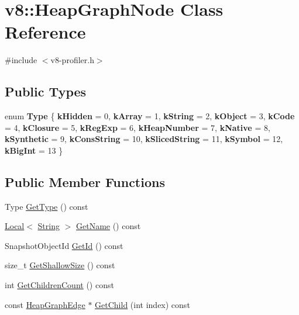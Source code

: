 \hypertarget{classv8_1_1HeapGraphNode}{}\section{v8\+:\+:Heap\+Graph\+Node Class Reference}
\label{classv8_1_1HeapGraphNode}


{\ttfamily \#include $<$v8-\/profiler.\+h$>$}

\subsection*{Public Types}
\begin{DoxyCompactItemize}
\item 
\mbox{\label{classv8_1_1HeapGraphNode_ab674a58103a51abc56f99edc6a1479ed}} 
enum {\bfseries Type} \{ \newline
{\bfseries k\+Hidden} = 0, 
{\bfseries k\+Array} = 1, 
{\bfseries k\+String} = 2, 
{\bfseries k\+Object} = 3, 
\newline
{\bfseries k\+Code} = 4, 
{\bfseries k\+Closure} = 5, 
{\bfseries k\+Reg\+Exp} = 6, 
{\bfseries k\+Heap\+Number} = 7, 
\newline
{\bfseries k\+Native} = 8, 
{\bfseries k\+Synthetic} = 9, 
{\bfseries k\+Cons\+String} = 10, 
{\bfseries k\+Sliced\+String} = 11, 
\newline
{\bfseries k\+Symbol} = 12, 
{\bfseries k\+Big\+Int} = 13
 \}
\end{DoxyCompactItemize}
\subsection*{Public Member Functions}
\begin{DoxyCompactItemize}
\item 
Type \mbox{\hyperlink{classv8_1_1HeapGraphNode_a9bd100b1338413f6153fe56a3fac60f1}{Get\+Type}} () const
\item 
\mbox{\hyperlink{classv8_1_1Local}{Local}}$<$ \mbox{\hyperlink{classv8_1_1String}{String}} $>$ \mbox{\hyperlink{classv8_1_1HeapGraphNode_a3a9d366c11fe526a11eea8dc878a58c0}{Get\+Name}} () const
\item 
Snapshot\+Object\+Id \mbox{\hyperlink{classv8_1_1HeapGraphNode_a62cd677be9c23067c6e2394b1fd154c6}{Get\+Id}} () const
\item 
size\+\_\+t \mbox{\hyperlink{classv8_1_1HeapGraphNode_ad61965a12cabdc7a4eeeb7e6aade46ba}{Get\+Shallow\+Size}} () const
\item 
int \mbox{\hyperlink{classv8_1_1HeapGraphNode_afb0afb27e5d5ae27b54376bc69f095ae}{Get\+Children\+Count}} () const
\item 
const \mbox{\hyperlink{classv8_1_1HeapGraphEdge}{Heap\+Graph\+Edge}} $\ast$ \mbox{\hyperlink{classv8_1_1HeapGraphNode_a3dc91726c26eb1c167706b112cd74564}{Get\+Child}} (int index) const
\end{DoxyCompactItemize}


